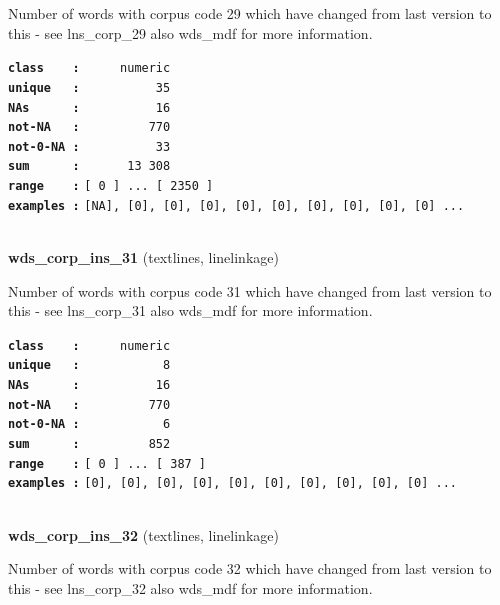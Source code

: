 \documentclass[]{article}
\begin{document}
Number of words with corpus code 29 which have changed from last version
to this - see lns\_corp\_29 also wds\_mdf for more information.

\textbf{\texttt{class\ \ \ \ :}} \texttt{~~~~~numeric}\\
\textbf{\texttt{unique\ \ \ :}} \texttt{~~~~~~~~~~35}\\
\textbf{\texttt{NAs\ \ \ \ \ \ :}} \texttt{~~~~~~~~~~16}\\
\textbf{\texttt{not-NA\ \ \ :}} \texttt{~~~~~~~~~770}\\
\textbf{\texttt{not-0-NA\ :}} \texttt{~~~~~~~~~~33}\\
\textbf{\texttt{sum\ \ \ \ \ \ :}} \texttt{~~~~~~13~308}\\
\textbf{\texttt{range\ \ \ \ :}}
\texttt{{[}\ 0\ {]}\ ...\ {[}\ 2350\ {]}}\\
\textbf{\texttt{examples\ :}}
\texttt{{[}NA{]},\ {[}0{]},\ {[}0{]},\ {[}0{]},\ {[}0{]},\ {[}0{]},\ {[}0{]},\ {[}0{]},\ {[}0{]},\ {[}0{]}\ ...}\\

~

\textbf{wds\_corp\_ins\_31} (textlines, linelinkage)

Number of words with corpus code 31 which have changed from last version
to this - see lns\_corp\_31 also wds\_mdf for more information.

\textbf{\texttt{class\ \ \ \ :}} \texttt{~~~~~numeric}\\
\textbf{\texttt{unique\ \ \ :}} \texttt{~~~~~~~~~~~8}\\
\textbf{\texttt{NAs\ \ \ \ \ \ :}} \texttt{~~~~~~~~~~16}\\
\textbf{\texttt{not-NA\ \ \ :}} \texttt{~~~~~~~~~770}\\
\textbf{\texttt{not-0-NA\ :}} \texttt{~~~~~~~~~~~6}\\
\textbf{\texttt{sum\ \ \ \ \ \ :}} \texttt{~~~~~~~~~852}\\
\textbf{\texttt{range\ \ \ \ :}}
\texttt{{[}\ 0\ {]}\ ...\ {[}\ 387\ {]}}\\
\textbf{\texttt{examples\ :}}
\texttt{{[}0{]},\ {[}0{]},\ {[}0{]},\ {[}0{]},\ {[}0{]},\ {[}0{]},\ {[}0{]},\ {[}0{]},\ {[}0{]},\ {[}0{]}\ ...}\\

~

\textbf{wds\_corp\_ins\_32} (textlines, linelinkage)

Number of words with corpus code 32 which have changed from last version
to this - see lns\_corp\_32 also wds\_mdf for more information.
\end{document}

